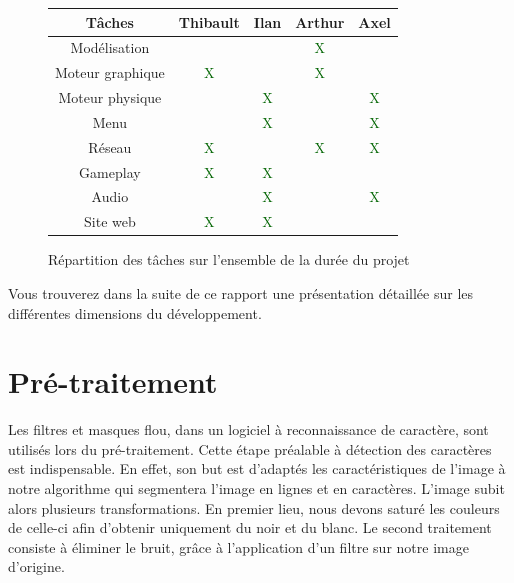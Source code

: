\documentclass[11pt]{report}
\begin{document}
\begin{figure}[htbp]
\centering
\begin{tabular}{ | c || c | c | c | c | }
\hline Tâches & Thibault & Ilan & Arthur & Axel \\
\hline Modélisation & & & \textcolor{darkgreen}{X} & \\
\hline Moteur graphique & \textcolor{darkgreen}{X} & & \textcolor{darkgreen}{X} & \\
\hline Moteur physique & & \textcolor{darkgreen}{X} & & \textcolor{darkgreen}{X} \\
\hline Menu & & \textcolor{darkgreen}{X} & & \textcolor{darkgreen}{X} \\
\hline Réseau & \textcolor{darkgreen}{X} & & \textcolor{darkgreen}{X} & \textcolor{darkgreen}{X} \\
\hline Gameplay & \textcolor{darkgreen}{X} & \textcolor{darkgreen}{X} & & \\
\hline Audio & & \textcolor{darkgreen}{X} & & \textcolor{darkgreen}{X} \\
\hline Site web & \textcolor{darkgreen}{X} & \textcolor{darkgreen}{X} & & \\
\hline
\end{tabular}
\caption{Répartition des tâches sur l'ensemble de la durée du projet}
\label{tab}
\end{figure}

Vous trouverez dans la suite de ce rapport une présentation détaillée sur les différentes dimensions du développement.


\chapter{Pré-traitement}

Les filtres et masques flou, dans un logiciel à reconnaissance de caractère, sont utilisés lors du pré-traitement. Cette étape préalable à détection des caractères est indispensable. En effet, son but est d’adaptés les caractéristiques de l'image à notre algorithme qui segmentera l'image en lignes et en caractères. L'image subit alors plusieurs transformations. En premier lieu, nous devons saturé les couleurs de celle-ci afin d'obtenir uniquement du noir et du blanc. Le second traitement consiste à éliminer le bruit, grâce à l'application d'un filtre sur notre image d'origine.
\end{document}
